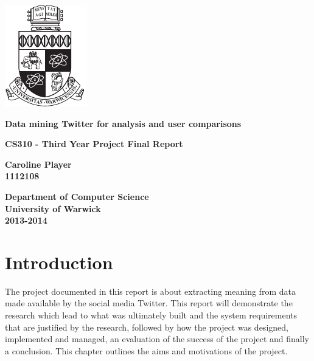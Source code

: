 \documentclass[11pt]{report}
\begin{document}
\thispagestyle{empty}

	\begin{center}
		\includegraphics[scale = 1.9]{./images/WarwickCrest.pdf}
	\end{center}
	\vspace{8mm}
	\begin{center}
		\bf {\Large Data mining Twitter for analysis and user comparisons}
	\end{center}
	\vspace{5mm}
	\begin{center}
		\bf {\Large CS310 - Third Year Project Final Report}
	\end{center}
	\vspace{20mm}
	\begin{center}
		{\bf Caroline Player\\
		1112108}
	\end{center}
	\vspace{20mm}
	\begin{center}
		{\bf Department of Computer Science\\University of Warwick\\\vspace{6mm}
		2013-2014}
	\end{center}


\tableofcontents

\listoffigures
\newpage

\setcounter{page}{1}


\chapter{Introduction}
The project documented in this report is about extracting meaning from data made available by the social media Twitter. This report will demonstrate the research which lead to what was ultimately built and the system requirements that are justified by the research, followed by how the project was designed, implemented and managed, an evaluation of the success of the project and finally a conclusion. This chapter outlines the aims and motivations of the project.

\end{document}
